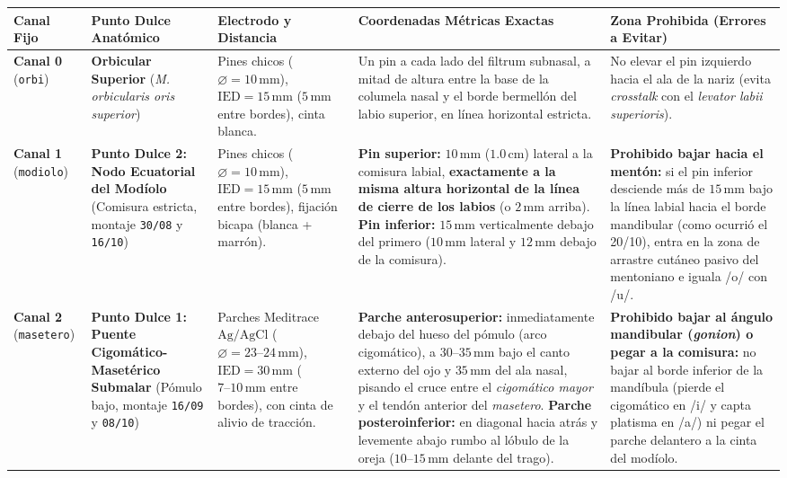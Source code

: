 \documentclass[11pt,a4paper]{article}
\begin{document}
\begin{table}[H]
\centering
\scriptsize
\begin{tabularx}{\textwidth}{l l p{2.5cm} p{3.8cm} X}
\toprule
\textbf{Canal Fijo} & \textbf{Punto Dulce Anatómico} & \textbf{Electrodo y Distancia} & \textbf{Coordenadas Métricas Exactas} & \textbf{Zona Prohibida (Errores a Evitar)} \\
\midrule
\textbf{Canal 0} \newline (\texttt{orbi}) & \textbf{Orbicular Superior} \newline (\textit{M. orbicularis oris superior}) & Pines chicos ($\varnothing = 10\,\text{mm}$), $\text{IED} = 15\,\text{mm}$ ($5\,\text{mm}$ entre bordes), cinta blanca. & Un pin a cada lado del filtrum subnasal, a mitad de altura entre la base de la columela nasal y el borde bermellón del labio superior, en línea horizontal estricta. & No elevar el pin izquierdo hacia el ala de la nariz (evita \textit{crosstalk} con el \textit{levator labii superioris}). \\
\midrule
\textbf{Canal 1} \newline (\texttt{modiolo}) & \textbf{Punto Dulce 2: Nodo Ecuatorial del Modíolo} \newline (Comisura estricta, montaje \texttt{30/08} y \texttt{16/10}) & Pines chicos ($\varnothing = 10\,\text{mm}$), $\text{IED} = 15\,\text{mm}$ ($5\,\text{mm}$ entre bordes), fijación bicapa (blanca + marrón). & \textbf{Pin superior:} $10\,\text{mm}$ ($1.0\,\text{cm}$) lateral a la comisura labial, \textbf{exactamente a la misma altura horizontal de la línea de cierre de los labios} (o $2\,\text{mm}$ arriba). \newline \textbf{Pin inferior:} $15\,\text{mm}$ verticalmente debajo del primero ($10\,\text{mm}$ lateral y $12\,\text{mm}$ debajo de la comisura). & \textbf{Prohibido bajar hacia el mentón:} si el pin inferior desciende más de $15\,\text{mm}$ bajo la línea labial hacia el borde mandibular (como ocurrió el 20/10), entra en la zona de arrastre cutáneo pasivo del mentoniano e iguala /o/ con /u/. \\
\midrule
\textbf{Canal 2} \newline (\texttt{masetero}) & \textbf{Punto Dulce 1: Puente Cigomático-Masetérico Submalar} \newline (Pómulo bajo, montaje \texttt{16/09} y \texttt{08/10}) & Parches Meditrace $\text{Ag/AgCl}$ ($\varnothing = 23\text{--}24\,\text{mm}$), $\text{IED} = 30\,\text{mm}$ ($7\text{--}10\,\text{mm}$ entre bordes), con cinta de alivio de tracción. & \textbf{Parche anterosuperior:} inmediatamente debajo del hueso del pómulo (arco cigomático), a $30\text{--}35\,\text{mm}$ bajo el canto externo del ojo y $35\,\text{mm}$ del ala nasal, pisando el cruce entre el \textit{cigomático mayor} y el tendón anterior del \textit{masetero}. \newline \textbf{Parche posteroinferior:} en diagonal hacia atrás y levemente abajo rumbo al lóbulo de la oreja ($10\text{--}15\,\text{mm}$ delante del trago). & \textbf{Prohibido bajar al ángulo mandibular (\textit{gonion}) o pegar a la comisura:} no bajar al borde inferior de la mandíbula (pierde el cigomático en /i/ y capta platisma en /a/) ni pegar el parche delantero a la cinta del modíolo. \\

\end{tabularx}
\end{table}
\end{document}
